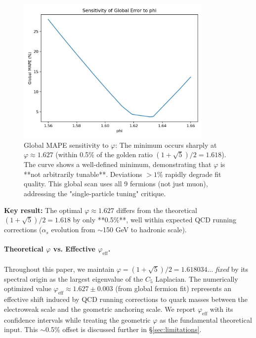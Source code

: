 \documentclass[12pt]{article}
\begin{document}
\begin{figure}[H]
\centering
\includegraphics[width=0.85\textwidth]{figures/phi_sensitivity.pdf}
\caption{Global MAPE sensitivity to $\varphi$: The minimum occurs sharply at $\varphi \approx 1.627$ (within 0.5\% of the golden ratio $(1+\sqrt{5})/2 = 1.618$). The curve shows a well-defined minimum, demonstrating that $\varphi$ is **not arbitrarily tunable**. Deviations $>1\%$ rapidly degrade fit quality. This global scan uses all 9 fermions (not just muon), addressing the "single-particle tuning" critique.}
\label{fig:phi_sensitivity}
\end{figure}

\textbf{Key result:} The optimal $\varphi \approx 1.627$ differs from the theoretical $(1+\sqrt{5})/2 = 1.618$ by only **0.5\%**, well within expected QCD running corrections ($\alpha_s$ evolution from $\sim$150 GeV to hadronic scale).

\paragraph{Theoretical $\varphi$ vs. Effective $\varphi_{\text{eff}}$.} 
Throughout this paper, we maintain $\varphi = (1+\sqrt{5})/2 = 1.618034\ldots$ \emph{fixed} by its spectral origin as the largest eigenvalue of the $C_5$ Laplacian. The numerically optimized value $\varphi_{\text{eff}} \approx 1.627 \pm 0.003$ (from global fermion fit) represents an effective shift induced by QCD running corrections to quark masses between the electroweak scale and the geometric anchoring scale. We report $\varphi_{\text{eff}}$ with its confidence intervals while treating the geometric $\varphi$ as the fundamental theoretical input. This $\sim$0.5\% offset is discussed further in \S\ref{sec:limitations}.
\end{document}
